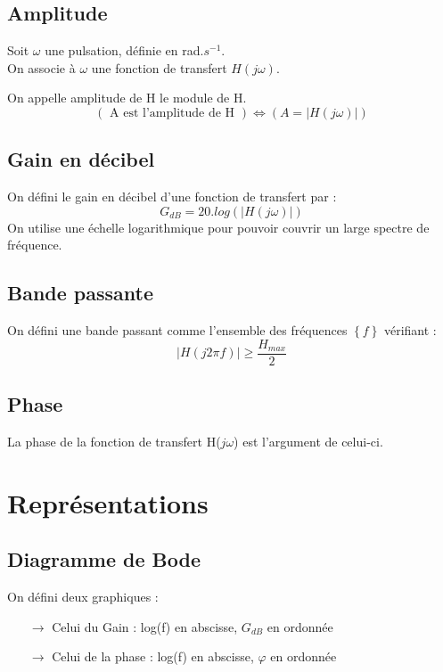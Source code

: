 \subsection{Amplitude}
Soit $\omega$ une pulsation, définie en rad.$s^{-1}$.\\
On associe à $\omega$ une fonction de transfert $H(j\omega)$.\\
\begin{de}
On appelle amplitude de H le module de H. 
$$(\mbox{ A est l'amplitude de H }) \Leftrightarrow ( A = |H(j\omega)|)$$
\end{de}
\subsection{Gain en décibel}
\begin{de}
On défini le gain en décibel d'une fonction de transfert par : 
$$G_{dB} = 20.log(|H(j\omega)|)$$
On utilise une échelle logarithmique pour pouvoir couvrir un large spectre de fréquence.
\end{de}
\subsection{Bande passante}
\begin{de}
On défini une bande passant comme l'ensemble des fréquences $\left\lbrace f \right\rbrace $ vérifiant :
$$| H(j2\pi f) | \geq \dfrac{H_{max}}{2} $$
\end{de}
\subsection{Phase}
\begin{de}
La phase de la fonction de transfert H($j\omega$) est l'argument de celui-ci.
\end{de}
\section{Représentations}
\subsection{Diagramme de Bode}
On défini deux graphiques : 
\begin{itemize}
 \item[$\rightarrow$] Celui du Gain : log(f) en abscisse, $G_{dB}$ en ordonnée
 \item[$\rightarrow$] Celui de la phase : log(f) en abscisse, $\varphi$ en ordonnée
\end{itemize}
